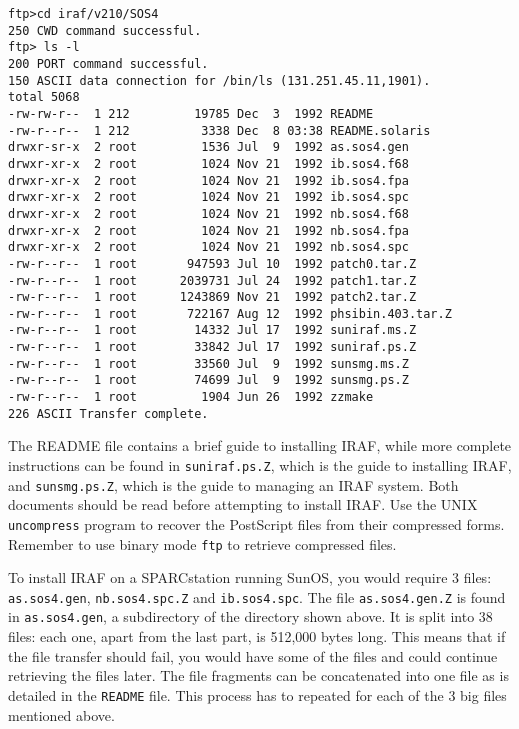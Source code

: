 {\footnotesize
\begin{verbatim}
ftp>cd iraf/v210/SOS4
250 CWD command successful.
ftp> ls -l
200 PORT command successful.
150 ASCII data connection for /bin/ls (131.251.45.11,1901).
total 5068
-rw-rw-r--  1 212         19785 Dec  3  1992 README
-rw-r--r--  1 212          3338 Dec  8 03:38 README.solaris
drwxr-sr-x  2 root         1536 Jul  9  1992 as.sos4.gen
drwxr-xr-x  2 root         1024 Nov 21  1992 ib.sos4.f68
drwxr-xr-x  2 root         1024 Nov 21  1992 ib.sos4.fpa
drwxr-xr-x  2 root         1024 Nov 21  1992 ib.sos4.spc
drwxr-xr-x  2 root         1024 Nov 21  1992 nb.sos4.f68
drwxr-xr-x  2 root         1024 Nov 21  1992 nb.sos4.fpa
drwxr-xr-x  2 root         1024 Nov 21  1992 nb.sos4.spc
-rw-r--r--  1 root       947593 Jul 10  1992 patch0.tar.Z
-rw-r--r--  1 root      2039731 Jul 24  1992 patch1.tar.Z
-rw-r--r--  1 root      1243869 Nov 21  1992 patch2.tar.Z
-rw-r--r--  1 root       722167 Aug 12  1992 phsibin.403.tar.Z
-rw-r--r--  1 root        14332 Jul 17  1992 suniraf.ms.Z
-rw-r--r--  1 root        33842 Jul 17  1992 suniraf.ps.Z
-rw-r--r--  1 root        33560 Jul  9  1992 sunsmg.ms.Z
-rw-r--r--  1 root        74699 Jul  9  1992 sunsmg.ps.Z
-rw-r--r--  1 root         1904 Jun 26  1992 zzmake
226 ASCII Transfer complete.

\end{verbatim}
}

The README file contains a brief guide to installing IRAF, while more
complete instructions can be found in {\tt suniraf.ps.Z}, which is the
guide to installing IRAF, and {\tt sunsmg.ps.Z}, which is the guide to
managing an IRAF system. Both documents should be read before
attempting to install IRAF. Use the UNIX {\tt uncompress} program
to recover the PostScript files from their compressed forms. Remember
to use binary mode {\tt ftp} to retrieve compressed files.

To install IRAF on a SPARCstation running SunOS, you would require 3
files: {\tt as.sos4.gen}, {\tt nb.sos4.spc.Z} and {\tt ib.sos4.spc}.
The file {\tt as.sos4.gen.Z} is found in
{\tt as.sos4.gen}, a subdirectory
of the directory shown above. It is split into 38
files: each one, apart from the last part, is 512,000 bytes long. This
means that if the file transfer should fail, you would have some of
the files and could continue retrieving the files later. The file
fragments can be concatenated into one file as is detailed in the
{\tt README} file. This process has to repeated for each of the 3 big files
mentioned above.

